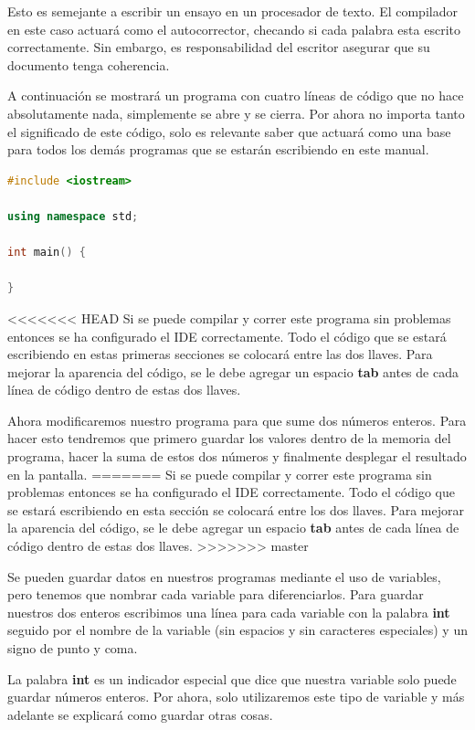 \documentclass{article}
\begin{document}
Esto es semejante a escribir un ensayo en un procesador de texto. El compilador en este caso actuará como el autocorrector, checando si cada palabra esta escrito correctamente. Sin embargo, es responsabilidad del escritor asegurar que su documento tenga coherencia.

A continuación se mostrará un programa con cuatro líneas de código que no hace absolutamente nada, simplemente se abre y se cierra. Por ahora no importa tanto el significado de este código, solo es relevante saber que actuará como una base para todos los demás programas que se estarán escribiendo en este manual.

\begin{lstlisting}[language=C++, title=Las cuatro líneas esenciales]
#include <iostream>

using namespace std;

int main() {

}
\end{lstlisting}

<<<<<<< HEAD
Si se puede compilar y correr este programa sin problemas entonces se ha configurado el IDE correctamente. Todo el código que se estará escribiendo en estas primeras secciones se colocará entre las dos llaves. Para mejorar la aparencia del código, se le debe agregar un espacio \textbf{tab} antes de cada línea de código dentro de estas dos llaves.

Ahora modificaremos nuestro programa para que sume dos números enteros. Para hacer esto tendremos que primero guardar los valores dentro de la memoria del programa, hacer la suma de estos dos números y finalmente desplegar el resultado en la pantalla.
=======
Si se puede compilar y correr este programa sin problemas entonces se ha configurado el IDE correctamente. Todo el código que se estará escribiendo en esta sección se colocará entre los dos llaves. Para mejorar la aparencia del código, se le debe agregar un espacio \textbf{tab} antes de cada línea de código dentro de estas dos llaves.
>>>>>>> master

Se pueden guardar datos en nuestros programas mediante el uso de variables, pero tenemos que nombrar cada variable para diferenciarlos. Para guardar nuestros dos enteros escribimos una línea para cada variable con la palabra \textbf{int} seguido por el nombre de la variable (sin espacios y sin caracteres especiales) y un signo de punto y coma.

La palabra \textbf{int} es un indicador especial que dice que nuestra variable solo puede guardar números enteros. Por ahora, solo utilizaremos este tipo de variable y más adelante se explicará como guardar otras cosas.
\end{document}
